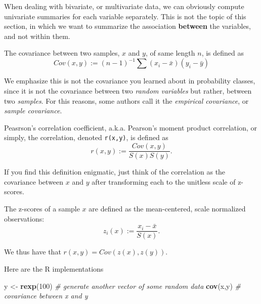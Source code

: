 \documentclass[]{book}
\newenvironment{Shaded}{\begin{snugshade}}{\end{snugshade}}
\newcommand{\KeywordTok}[1]{\textcolor[rgb]{0.13,0.29,0.53}{\textbf{#1}}}
\newcommand{\DecValTok}[1]{\textcolor[rgb]{0.00,0.00,0.81}{#1}}
\newcommand{\StringTok}[1]{\textcolor[rgb]{0.31,0.60,0.02}{#1}}
\newcommand{\CommentTok}[1]{\textcolor[rgb]{0.56,0.35,0.01}{\textit{#1}}}
\newcommand{\NormalTok}[1]{#1}
\theoremstyle{definition}
\theoremstyle{definition}
\theoremstyle{definition}
\theoremstyle{remark}
\let\BeginKnitrBlock\begin \let\EndKnitrBlock\end
\begin{document}
When dealing with bivariate, or multivariate data, we can obviously
compute univariate summaries for each variable separately. This is not
the topic of this section, in which we want to summarize the association
\textbf{between} the variables, and not within them.

\BeginKnitrBlock{definition}[Covariance]
\protect\hypertarget{def:unnamed-chunk-123}{}{\label{def:unnamed-chunk-123}
{} }The covariance between two samples, \(x\)
and \(y\), of same length \(n\), is defined as
\[Cov(x,y):= (n-1)^{-1} \sum (x_i-\bar x)(y_i-\bar y)  \]
\EndKnitrBlock{definition}

We emphasize this is not the covariance you learned about in probability
classes, since it is not the covariance between two \emph{random
variables} but rather, between two \emph{samples}. For this reasons,
some authors call it the \emph{empirical covariance}, or \emph{sample
covariance}.

\BeginKnitrBlock{definition}[Pearson's Correlation Coefficient]
\protect\hypertarget{def:unnamed-chunk-124}{}{\label{def:unnamed-chunk-124}
{} }Peasrson's
correlation coefficient, a.k.a. Pearson's moment product correlation, or
simply, the correlation, denoted \texttt{r(x,y)}, is defined as
\[r(x,y):=\frac{Cov(x,y)}{S(x)S(y)}. \]
\EndKnitrBlock{definition}

If you find this definition enigmatic, just think of the correlation as
the covariance between \(x\) and \(y\) after transforming each to the
unitless scale of z-scores.

\BeginKnitrBlock{definition}[Z-Score]
\protect\hypertarget{def:unnamed-chunk-125}{}{\label{def:unnamed-chunk-125}
{} }The z-scores of a sample \(x\) are defined as
the mean-centered, scale normalized observations:
\[z_i(x):= \frac{x_i-\bar x}{S(x)}.\]
\EndKnitrBlock{definition}

We thus have that \(r(x,y)=Cov(z(x),z(y))\).

Here are the R implementations

\begin{Shaded}
\begin{Highlighting}[]
\NormalTok{y <-}\StringTok{ }\KeywordTok{rexp}\NormalTok{(}\DecValTok{100}\NormalTok{) }\CommentTok{# generate another vector of some random data}
\KeywordTok{cov}\NormalTok{(x,y) }\CommentTok{# covariance between x and y}
\end{Highlighting}
\end{Shaded}
\end{document}
